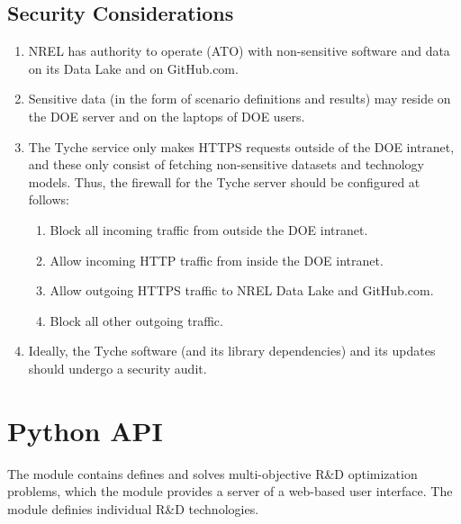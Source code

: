 \documentclass[letterpaper,10pt,english]{sphinxmanual}
\begin{document}
\section{Security Considerations}
\label{\detokenize{deployment:security-considerations}}\begin{enumerate}
\def\theenumi{\arabic{enumi}}
\def\labelenumi{\theenumi .}
\makeatletter\def\p@enumii{\p@enumi \theenumi .}\makeatother
\item {} 
NREL has authority to operate (ATO) with non-sensitive software and
data on its Data Lake and on GitHub.com.

\item {} 
Sensitive data (in the form of scenario definitions and results) may
reside on the DOE server and on the laptops of DOE users.

\item {} 
The Tyche service only makes HTTPS  requests outside of the
DOE intranet, and these only consist of fetching non-sensitive
datasets and technology models. Thus, the firewall for the Tyche
server should be configured at follows:
\begin{enumerate}
\def\theenumii{\arabic{enumii}}
\def\labelenumii{\theenumii .}
\makeatletter\def\p@enumiii{\p@enumii \theenumii .}\makeatother
\item {} 
Block all incoming traffic from outside the DOE intranet.

\item {} 
Allow incoming HTTP traffic from inside the DOE intranet.

\item {} 
Allow outgoing HTTPS traffic to NREL Data Lake and GitHub.com.

\item {} 
Block all other outgoing traffic.

\end{enumerate}

\item {} 
Ideally, the Tyche software (and its library dependencies) and its
updates should undergo a security audit.

\end{enumerate}


\chapter{Python API}
\label{\detokenize{modules:python-api}}\label{\detokenize{modules:sec-modules}}\label{\detokenize{modules::doc}}
The module {\hyperref[\detokenize{tyche:module-tyche}]{}} contains defines and solves multi-objective R\&D
optimization problems, which the module {\hyperref[\detokenize{eutychia:module-eutychia}]{}} provides a server
of a web-based user interface. The module {\hyperref[\detokenize{technology:module-technology}]{}} definies
individual R\&D technologies.
\end{document}
